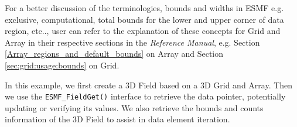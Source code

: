     For a better discussion of the terminologies, bounds and widths in ESMF
    e.g. exclusive, computational, total bounds
    for the lower and upper corner of data region, etc.., user can refer to
    the explanation of these concepts for Grid and Array in their respective sections
    in the {\it Reference Manual}, e.g. Section \ref{Array_regions_and_default_bounds} on Array
    and Section \ref{sec:grid:usage:bounds} on Grid.
  
    In this example, we first create a 3D Field based on a 3D Grid and Array.
    Then we use the {\tt ESMF\_FieldGet()} interface to retrieve the data pointer,
    potentially updating or verifying its values. We also retrieve the bounds and counts
    information of the 3D Field to assist in data element iteration.
   

